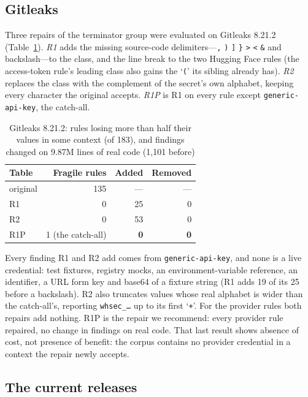 \documentclass[10pt,journal,compsoc]{IEEEtran}
\begin{document}
\subsection{Gitleaks}

Three repairs of the terminator group were evaluated on Gitleaks 8.21.2 (Table~\ref{tab:glrepair}). \emph{R1} adds the missing source-code delimiters---\texttt{,} \texttt{)} \texttt{]} \texttt{\}} \texttt{>} \texttt{<} \texttt{\&} and backslash---to the class, and the line break to the two Hugging Face rules (the access-token rule's leading class also gains the `\texttt{(}' its sibling already has). \emph{R2} replaces the class with the complement of the secret's own alphabet, keeping every character the original accepts. \emph{R1P} is R1 on every rule except \texttt{generic-api-key}, the catch-all.

\begin{table}[t]
\centering
\caption{Gitleaks 8.21.2: rules losing more than half their values in some context (of 183), and findings changed on 9.87M lines of real code (1{,}101 before)}
\label{tab:glrepair}
\footnotesize
\begin{tabular}{@{}lrrr@{}}
\toprule
Table & Fragile rules & Added & Removed \\
\midrule
original & 135 & --- & --- \\
R1 & 0 & 25 & 0 \\
R2 & 0 & 53 & 0 \\
R1P & 1 (the catch-all) & \textbf{0} & \textbf{0} \\
\bottomrule
\end{tabular}
\end{table}

Every finding R1 and R2 add comes from \texttt{generic-api-key}, and none is a live credential: test fixtures, registry mocks, an environment-variable reference, an identifier, a URL form key and base64 of a fixture string (R1 adds 19 of its 25 before a backslash). R2 also truncates values whose real alphabet is wider than the catch-all's, reporting \texttt{whsec\_\ldots} up to its first `\texttt{+}'. For the provider rules both repairs add nothing. R1P is the repair we recommend: every provider rule repaired, no change in findings on real code. That last result shows absence of cost, not presence of benefit: the corpus contains no provider credential in a context the repair newly accepts.

\subsection{The current releases}
\label{sec:current}
\end{document}
